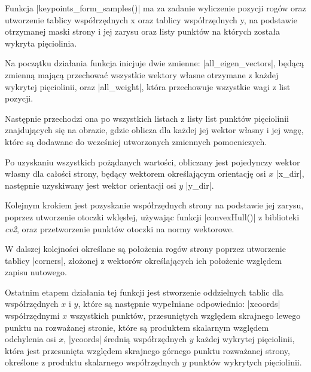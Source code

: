 Funkcja \pyth|keypoints_form_samples()| ma za zadanie wyliczenie pozycji rogów oraz utworzenie tablicy współrzędnych x oraz tablicy współrzędnych y, na podstawie otrzymanej maski strony i jej zarysu oraz listy punktów na których została wykryta pięciolinia.

Na początku działania funkcja inicjuje dwie zmienne: \pyth|all_eigen_vectors|, będącą zmienną mającą przechować wszystkie wektory własne otrzymane z każdej wykrytej pięciolinii, oraz \pyth|all_weight|, która przechowuje wszystkie wagi z list pozycji.

Następnie przechodzi ona po wszystkich listach z listy list punktów pięciolinii znajdujących się na obrazie, gdzie oblicza dla każdej jej wektor własny i jej wagę, które są dodawane do wcześniej utworzonych zmiennych pomocniczych.

Po uzyskaniu wszystkich pożądanych wartości, obliczany jest pojedynczy wektor własny dla całości strony, będący wektorem określającym orientację osi $x$ \pyth|x_dir|, następnie uzyskiwany jest wektor orientacji osi $y$ \pyth|y_dir|.

Kolejnym krokiem jest pozyskanie współrzędnych strony na podstawie jej zarysu, poprzez utworzenie otoczki wklęsłej, używając funkcji \pyth|convexHull()| z biblioteki \textit{cv2}, oraz przetworzenie punktów otoczki na normy wektorowe.

W dalszej kolejności określane są położenia rogów strony poprzez utworzenie tablicy \pyth|corners|, złożonej z wektorów określających ich położenie względem zapisu nutowego.

Ostatnim etapem działania tej funkcji jest stworzenie oddzielnych tablic dla współrzędnych $x$ i $y$, które są następnie wypełniane odpowiednio: \pyth|xcoords| współrzędnymi $x$ wszystkich punktów, przesuniętych względem skrajnego lewego punktu na rozważanej stronie, które są produktem skalarnym względem odchylenia osi $x$, \pyth|ycoords| średnią współrzędnych $y$ każdej wykrytej pięciolinii, która jest przesunięta względem skrajnego górnego punktu rozważanej strony, określone z produktu skalarnego współrzędnych $y$ punktów wykrytych pięciolinii. 

